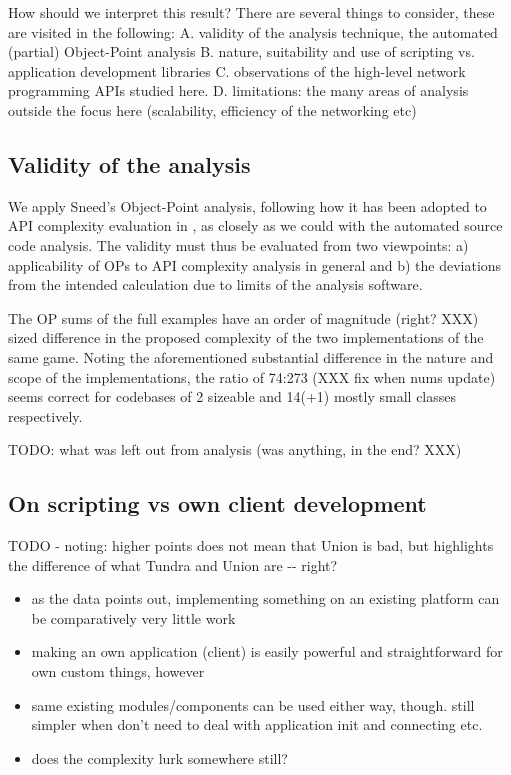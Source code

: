 \documentclass[conference]{IEEEtran}
\begin{document}
How should we interpret this result? There are several things to
consider, these are visited in the following: A. validity of the
analysis technique, the automated (partial) Object-Point
analysis B. nature, suitability and use of scripting vs. application
development libraries C. observations of the high-level network
programming APIs studied here. D. limitations: the many areas of
analysis outside the focus here (scalability, efficiency of the
networking etc)


\subsection{Validity of the analysis%
  \label{validity-of-the-analysis}%
}

We apply Sneed's Object-Point analysis, following how it has been
adopted to API complexity evaluation in \cite{api-complexity-analysis}, as
closely as we could with the automated source code analysis. The
validity must thus be evaluated from two viewpoints: a) applicability
of OPs to API complexity analysis in general and b) the deviations
from the intended calculation due to limits of the analysis software.

The OP sums of the full examples have an order of magnitude
(right? XXX) sized difference in the proposed complexity of the two
implementations of the same game. Noting the aforementioned
substantial difference in the nature and scope of the implementations,
the ratio of 74:273 (XXX fix when nums update) seems correct for
codebases of 2 sizeable and 14(+1) mostly small classes respectively.

TODO: what was left out from analysis (was anything, in the end? XXX)


\subsection{On scripting vs own client development%
  \label{on-scripting-vs-own-client-development}%
}

TODO - noting: higher points does not mean that Union is bad, but
highlights the difference of what Tundra and Union are -{}- right?
%
\begin{itemize}

\item as the data points out, implementing something on an existing
platform can be comparatively very little work

\item making an own application (client) is easily powerful and
straightforward for own custom things, however

\item same existing modules/components can be used either way,
though. still simpler when don't need to deal with application init
and connecting etc.

\item does the complexity lurk somewhere still?

\end{itemize}
\end{document}
